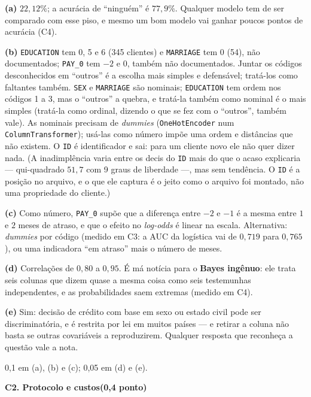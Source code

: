 \documentclass[11pt,a4paper]{article}
\newcommand{\tarefa}[3]{%
  \bigskip\par\noindent
  {\large\bfseries\color{azulufrj}#1. #2}\hfill{\bfseries(#3)}\par
  \nopagebreak\vspace{0.3em}}
\newcommand{\cod}[1]{\texttt{#1}}
\begin{document}
\begin{solucao}
\textbf{(a)} $22{,}12\%$; a acurácia de ``ninguém'' é $77{,}9\%$. Qualquer modelo tem
de ser comparado com esse piso, e mesmo um bom modelo vai ganhar poucos pontos de
acurácia (C4).

\textbf{(b)} \cod{EDUCATION} tem 0, 5 e 6 (345 clientes) e \cod{MARRIAGE} tem 0 (54),
não documentados; \cod{PAY\_0} tem $-2$ e $0$, também não documentados. Juntar os
códigos desconhecidos em ``outros'' é a escolha mais simples e defensável; tratá-los
como faltantes também. \cod{SEX} e \cod{MARRIAGE} são nominais; \cod{EDUCATION} tem
ordem nos códigos 1 a 3, mas o ``outros'' a quebra, e tratá-la também como nominal é o
mais simples (tratá-la como ordinal, dizendo o que se fez com o ``outros'', também
vale). As nominais precisam de \emph{dummies} (\cod{OneHotEncoder} num
\cod{ColumnTransformer}); usá-las como número impõe uma ordem e distâncias que não
existem. O \cod{ID} é
identificador e sai: para um cliente novo ele não quer dizer nada. (A inadimplência
varia entre os decis do \cod{ID} mais do que o acaso explicaria --- qui-quadrado
$51{,}7$ com 9 graus de liberdade ---, mas sem tendência. O \cod{ID} é a posição no
arquivo, e o que ele captura é o jeito como o arquivo foi montado, não uma propriedade
do cliente.)

\textbf{(c)} Como número, \cod{PAY\_0} supõe que a diferença entre $-2$ e $-1$ é a mesma
entre $1$ e $2$ meses de atraso, e que o efeito no \emph{log-odds} é linear na
escala. Alternativa: \emph{dummies} por código (medido em C3: a AUC da logística vai
de $0{,}719$ para $0{,}765$), ou uma indicadora ``em atraso'' mais o número de meses.

\textbf{(d)} Correlações de $0{,}80$ a $0{,}95$. É má notícia para o \textbf{Bayes
ingênuo}: ele trata seis colunas que dizem quase a mesma coisa como seis testemunhas
independentes, e as probabilidades saem extremas (medido em C4).

\textbf{(e)} Sim: decisão de crédito com base em sexo ou estado civil pode ser
discriminatória, e é restrita por lei em muitos países --- e retirar a coluna não
basta se outras covariáveis a reproduzirem. Qualquer resposta que reconheça a questão
vale a nota.
\end{solucao}

\begin{criterio}
0,1 em (a), (b) e (c); 0,05 em (d) e (e).
\end{criterio}

\tarefa{C2}{Protocolo e custos}{0,4 ponto}
\end{document}
